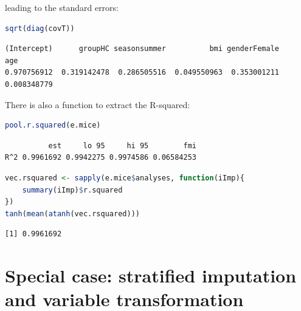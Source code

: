 \documentclass[12pt]{article}
\begin{document}
leading to the standard errors:
\begin{lstlisting}[language=r,numbers=none]
sqrt(diag(covT))
\end{lstlisting}
\label{}
\begin{verbatim}
(Intercept)      groupHC seasonsummer          bmi genderFemale          age 
0.970756912  0.319142478  0.286505516  0.049550963  0.353001211  0.008348779
\end{verbatim}


\bigskip

There is also a function to extract the R-squared:
\begin{lstlisting}[language=r,numbers=none]
pool.r.squared(e.mice)
\end{lstlisting}

\label{}
\begin{verbatim}
          est     lo 95     hi 95        fmi
R^2 0.9961692 0.9942275 0.9974586 0.06584253
\end{verbatim}


\begin{lstlisting}[language=r,numbers=none]
vec.rsquared <- sapply(e.mice$analyses, function(iImp){
    summary(iImp)$r.squared
})
tanh(mean(atanh(vec.rsquared)))
\end{lstlisting}

\label{}
\begin{verbatim}
[1] 0.9961692
\end{verbatim}


\clearpage
\section{Special case: stratified imputation \newline and variable transformation}
\label{sec:org1d73a81}
\end{document}
